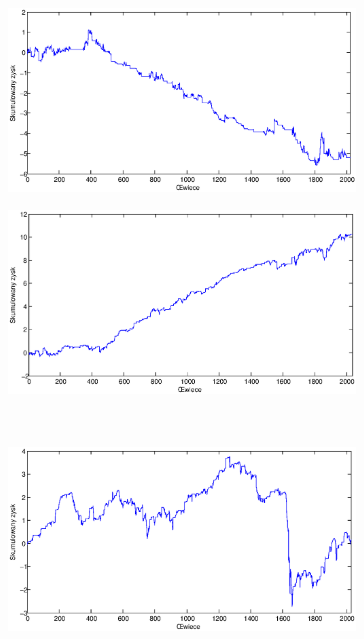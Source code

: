 \documentclass{tewiart}
\begin{document}
\begin{figure}[h]
\centering
\begin{minipage}{.49\linewidth}
\centering 
\includegraphics[width=0.82\textwidth]{images/S1a_silver.eps}
\label{jedno}
\end{minipage}
\begin{minipage}{.49\linewidth}
\centering 
\includegraphics[width=0.82\textwidth]{images/S1b_silver.eps}
\label{dwu}
\end{minipage}
\\
\begin{minipage}{.49\linewidth}
\centering 
\includegraphics[width=0.82\textwidth]{images/S1c_silver.eps}
\label{cztero}
\end{minipage}
\begin{minipage}{.49\linewidth}

\end{minipage}
\end{figure}
\end{document}
